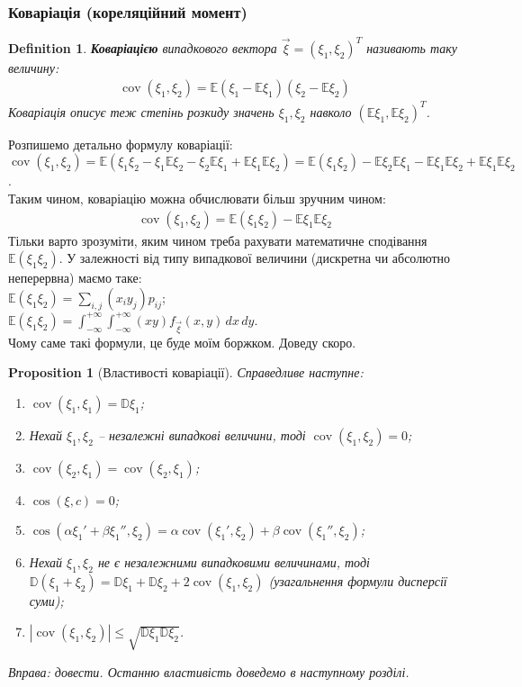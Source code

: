 \documentclass[a4paper, 10pt]{article}
\theoremstyle{theoremdd}
\newtheorem{definition}[theorem]{Definition}
\newtheorem{proposition}[theorem]{Proposition}
\DeclareMathOperator{\cov}{cov}
\begin{document}
\subsubsection{Коваріація (кореляційний момент)}
\begin{definition}
\textbf{Коваріацією} випадкового вектора $\vec{\xi} = (\xi_1,\xi_2)^T$ називають таку величину:
\begin{align*}
\cov(\xi_1,\xi_2) = \mathbb{E}(\xi_1 - \mathbb{E}\xi_1)(\xi_2 - \mathbb{E}\xi_2)
\end{align*}
Коваріація описує теж степінь розкиду значень $\xi_1,\xi_2$ навколо $(\mathbb{E}\xi_1,\mathbb{E}\xi_2)^T$.
\end{definition}
\noindent Розпишемо детально формулу коваріації:\\
$\cov(\xi_1,\xi_2) = \mathbb{E}(\xi_1 \xi_2 - \xi_1 \mathbb{E}\xi_2 - \xi_2 \mathbb{E}\xi_1 + \mathbb{E}\xi_1 \mathbb{E}\xi_2) = \mathbb{E}(\xi_1\xi_2) - \mathbb{E}\xi_2 \mathbb{E}\xi_1 - \mathbb{E}\xi_1 \mathbb{E}\xi_2 + \mathbb{E}\xi_1 \mathbb{E}\xi_2$.\\
Таким чином, коваріацію можна обчислювати більш зручним чином:
\begin{align*}
\cov(\xi_1,\xi_2) = \mathbb{E}(\xi_1\xi_2) - \mathbb{E}\xi_1 \mathbb{E}\xi_2
\end{align*}
Тільки варто зрозуміти, яким чином треба рахувати математичне сподівання $\mathbb{E}(\xi_1\xi_2)$. У залежності від типу випадкової величини (дискретна чи абсолютно неперервна) маємо таке:\\
$\mathbb{E}(\xi_1\xi_2) = \displaystyle\sum_{i,j} (x_i y_j)p_{ij}$;\\
$\mathbb{E}(\xi_1\xi_2) = \displaystyle\int_{-\infty}^{+\infty}\int_{-\infty}^{+\infty} (xy) f_{\vec{\xi}}(x,y)\,dx\,dy$.\\
Чому саме такі формули, це буде моїм боржком. Доведу скоро.

\begin{proposition}[Властивості коваріації]
Справедливе наступне:
\begin{enumerate}[nosep,wide=0pt,label={\arabic*)}]
\item $\cov(\xi_1,\xi_1) = \mathbb{D}\xi_1$;
\item Нехай $\xi_1,\xi_2$ -- незалежні випадкові величини, тоді $\cov(\xi_1,\xi_2) = 0$;
\item $\cov(\xi_2,\xi_1) = \cov(\xi_2,\xi_1)$;
\item $\cos(\xi,c) = 0$;
\item $\cos(\alpha \xi_1' + \beta \xi_1'', \xi_2) = \alpha \cov(\xi_1',\xi_2) + \beta \cov(\xi_1'',\xi_2)$;
\item Нехай $\xi_1,\xi_2$ не є незалежними випадковими величинами, тоді $\mathbb{D}(\xi_1+\xi_2) = \mathbb{D}\xi_1 + \mathbb{D}\xi_2 + 2 \cov(\xi_1,\xi_2)$ (узагальнення формули дисперсії суми);
\item $|\cov(\xi_1,\xi_2)| \leq \sqrt{\mathbb{D}\xi_1 \mathbb{D}\xi_2}$.
\iffalse
\item $\cov(\mathbb{1}_A, \mathbb{1}_B) = \mathbb{P}(A \cap B) - \mathbb{P}(A) \mathbb{P}(B)$
\fi
\end{enumerate}
\textit{Вправа: довести. Останню властивість доведемо в наступному розділі.}
\end{proposition}
\end{document}

